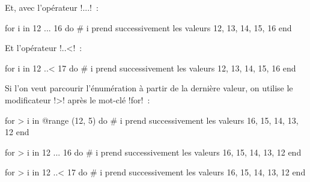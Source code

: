 Et, avec l'opérateur \ggsq!...!~:
\begin{galgas34}
for i in 12 ... 16 do
  # i prend successivement les valeurs 12, 13, 14, 15, 16
end
\end{galgas34}

Et l'opérateur \ggsq!..<!~:
\begin{galgas34}
for i in 12 ..< 17 do
  # i prend successivement les valeurs 12, 13, 14, 15, 16
end
\end{galgas34}

Si l'on veut parcourir l'énumération à partir de la dernière valeur, on utilise le modificateur \ggsq!>! après le mot-clé \ggsq!for!~:
\begin{galgas34}
for > i in @range (12, 5) do
  # i prend successivement les valeurs 16, 15, 14, 13, 12
end
\end{galgas34}

\begin{galgas34}
for > i in 12 ... 16 do
  # i prend successivement les valeurs 16, 15, 14, 13, 12
end
\end{galgas34}

\begin{galgas34}
for > i in 12 ..< 17 do
  # i prend successivement les valeurs 16, 15, 14, 13, 12
end
\end{galgas34}


